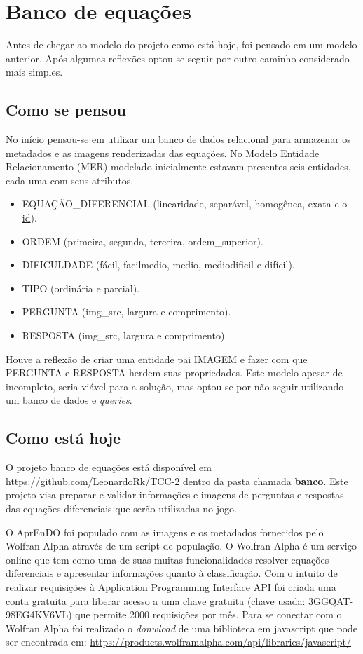 \section[Banco de equações]{Banco de equações}
Antes de chegar ao modelo do projeto como está hoje, foi pensado em um modelo anterior. Após algumas reflexões
optou-se seguir por outro caminho considerado mais simples.

\subsection[Como se pensou]{Como se pensou}

No início pensou-se em utilizar um banco de dados relacional para armazenar os metadados e as imagens renderizadas das equações. No Modelo Entidade Relacionamento (MER) modelado inicialmente estavam presentes seis entidades, cada uma com seus atributos. 

\begin{itemize}
	\item EQUAÇÃO\_DIFERENCIAL (linearidade, separável, homogênea, exata e o \underline{id}).
	\item ORDEM (primeira, segunda, terceira, ordem\_superior).
	\item DIFICULDADE (fácil, facilmedio, medio, mediodificil e difícil).
	\item TIPO (ordinária e parcial).
	\item PERGUNTA (img\_src, largura e comprimento).
	\item RESPOSTA (img\_src, largura e comprimento).
\end{itemize}

Houve a reflexão de criar uma entidade pai IMAGEM e fazer com que PERGUNTA e RESPOSTA herdem suas propriedades. Este modelo apesar de incompleto, seria viável para a solução, mas optou-se por não seguir utilizando um banco de dados e \textit{queries}.

\subsection[Como está hoje]{Como está hoje}

O projeto banco de equações está disponível em \url{https://github.com/LeonardoRk/TCC-2} dentro da pasta chamada \textbf{banco}. Este projeto visa preparar e validar informações e imagens de perguntas e respostas das equações diferenciais que serão utilizadas no jogo.

O AprEnDO foi populado com as imagens e os metadados fornecidos pelo Wolfran Alpha através de um script de população. O Wolfran Alpha é um serviço online que tem como uma de suas muitas funcionalidades resolver equações diferenciais e apresentar informações quanto à classificação. Com o intuito de realizar requisições à Application Programming Interface API foi criada uma conta gratuita para liberar acesso a uma chave gratuita (chave usada: 3GGQAT-98EG4KV6VL) que permite 2000 requisições por mês. Para se conectar com o Wolfran Alpha foi realizado o \textit{donwload} de uma biblioteca em javascript que pode ser encontrada em: \url{https://products.wolframalpha.com/api/libraries/javascript/} 

